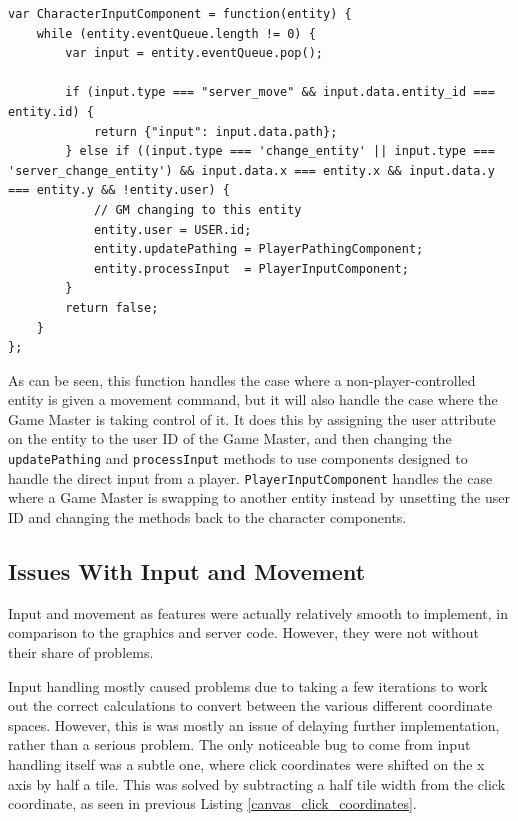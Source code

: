 \noindent
\begin{minipage}{\linewidth}
\begin{lstlisting}[style=js, caption={Input component for handling server input applied to non-player-controlled characters.}, label=characterinputcomponent]
var CharacterInputComponent = function(entity) {
    while (entity.eventQueue.length != 0) {
        var input = entity.eventQueue.pop();

        if (input.type === "server_move" && input.data.entity_id === entity.id) {
            return {"input": input.data.path};
        } else if ((input.type === 'change_entity' || input.type === 'server_change_entity') && input.data.x === entity.x && input.data.y === entity.y && !entity.user) {
            // GM changing to this entity
            entity.user = USER.id;
            entity.updatePathing = PlayerPathingComponent;
            entity.processInput  = PlayerInputComponent;
        }
        return false;
    }
};
\end{lstlisting}
\end{minipage}

As can be seen, this function handles the case where a non-player-controlled entity is given a movement command, but it will also handle the case where the Game Master is taking control of it. It does this by assigning the user attribute on the entity to the user ID of the Game Master, and then changing the \texttt{updatePathing} and \texttt{processInput} methods to use components designed to handle the direct input from a player. \texttt{PlayerInputComponent} handles the case where a Game Master is swapping to another entity instead by unsetting the user ID and changing the methods back to the character components.

\subsection{Issues With Input and Movement}
Input and movement as features were actually relatively smooth to implement, in comparison to the graphics and server code. However, they were not without their share of problems.

Input handling mostly caused problems due to taking a few iterations to work out the correct calculations to convert between the various different coordinate spaces. However, this is was mostly an issue of delaying further implementation, rather than a serious problem. The only noticeable bug to come from input handling itself was a subtle one, where click coordinates were shifted on the x axis by half a tile. This was solved by subtracting a half tile width from the click coordinate, as seen in previous Listing \ref{canvas_click_coordinates}.

